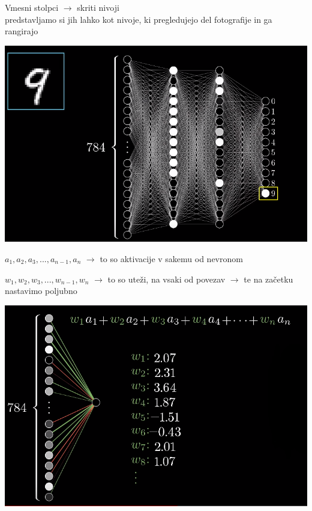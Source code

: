 \documentclass{beamer}
\begin{document}
\begin{frame}{}
Vmesni stolpci $\rightarrow$ skriti nivoji \\
\smallskip
predstavljamo si jih lahko kot nivoje, ki pregledujejo del fotografije in ga rangirajo
\begin{center}
\includegraphics[scale = 0.55]{photo/foto4}
\end{center}
\end{frame}

\begin{frame}{}
\begin{math}
a_1, a_2, a_3, ..., a_{n-1}, a_n
\end{math}
$ \rightarrow$ {to so aktivacije v sakemu od nevronom}

\begin{math}
w_1, w_2, w_3, ..., w_{n-1}, w_n
\end{math}
$ \rightarrow$ {to so uteži, na vsaki od povezav} $ \rightarrow$ te na začetku nastavimo poljubno

\begin{center}
\includegraphics[scale = 0.5]{photo/foto6}
\end{center}
\end{frame}
\end{document}
